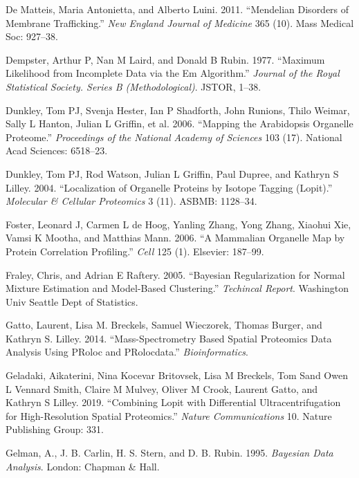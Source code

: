 \documentclass[]{article}
\begin{document}
\hypertarget{ref-De:2011}{}
De Matteis, Maria Antonietta, and Alberto Luini. 2011. ``Mendelian
Disorders of Membrane Trafficking.'' \emph{New England Journal of
Medicine} 365 (10). Mass Medical Soc: 927--38.

\hypertarget{ref-EM:1977}{}
Dempster, Arthur P, Nan M Laird, and Donald B Rubin. 1977. ``Maximum
Likelihood from Incomplete Data via the Em Algorithm.'' \emph{Journal of
the Royal Statistical Society. Series B (Methodological)}. JSTOR, 1--38.

\hypertarget{ref-Dunkley:2006}{}
Dunkley, Tom PJ, Svenja Hester, Ian P Shadforth, John Runions, Thilo
Weimar, Sally L Hanton, Julian L Griffin, et al. 2006. ``Mapping the
Arabidopsis Organelle Proteome.'' \emph{Proceedings of the National
Academy of Sciences} 103 (17). National Acad Sciences: 6518--23.

\hypertarget{ref-Dunkley:2004}{}
Dunkley, Tom PJ, Rod Watson, Julian L Griffin, Paul Dupree, and Kathryn
S Lilley. 2004. ``Localization of Organelle Proteins by Isotope Tagging
(Lopit).'' \emph{Molecular \& Cellular Proteomics} 3 (11). ASBMB:
1128--34.

\hypertarget{ref-Foster:2006}{}
Foster, Leonard J, Carmen L de Hoog, Yanling Zhang, Yong Zhang, Xiaohui
Xie, Vamsi K Mootha, and Matthias Mann. 2006. ``A Mammalian Organelle
Map by Protein Correlation Profiling.'' \emph{Cell} 125 (1). Elsevier:
187--99.

\hypertarget{ref-Fraley:2005}{}
Fraley, Chris, and Adrian E Raftery. 2005. ``Bayesian Regularization for
Normal Mixture Estimation and Model-Based Clustering.'' \emph{Techincal
Report}. Washington Univ Seattle Dept of Statistics.

\hypertarget{ref-pRoloc:2014}{}
Gatto, Laurent, Lisa M. Breckels, Samuel Wieczorek, Thomas Burger, and
Kathryn S. Lilley. 2014. ``Mass-Spectrometry Based Spatial Proteomics
Data Analysis Using PRoloc and PRolocdata.'' \emph{Bioinformatics}.

\hypertarget{ref-DC:2018}{}
Geladaki, Aikaterini, Nina Kocevar Britovsek, Lisa M Breckels, Tom Sand
Owen L Vennard Smith, Claire M Mulvey, Oliver M Crook, Laurent Gatto,
and Kathryn S Lilley. 2019. ``Combining Lopit with Differential
Ultracentrifugation for High-Resolution Spatial Proteomics.''
\emph{Nature Communications} 10. Nature Publishing Group: 331.

\hypertarget{ref-Gelman:1995}{}
Gelman, A., J. B. Carlin, H. S. Stern, and D. B. Rubin. 1995.
\emph{Bayesian Data Analysis}. London: Chapman \& Hall.
\end{document}
